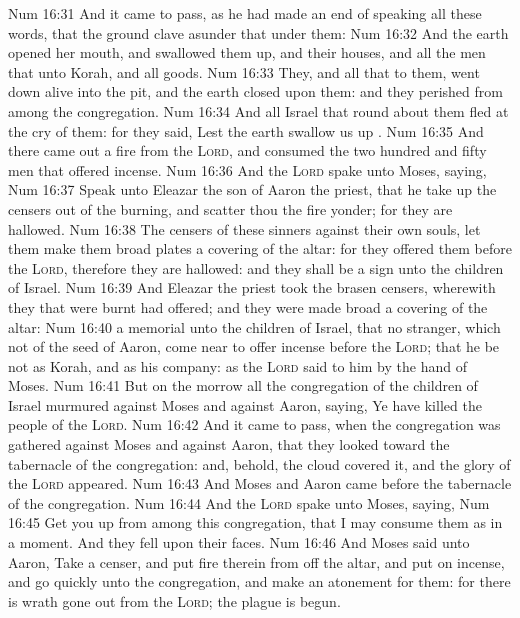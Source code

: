 \vs Num 16:31 And it came to pass, as he had made an end of speaking all these words, that the ground clave asunder that  under them:
\vs Num 16:32 And the earth opened her mouth, and swallowed them up, and their houses, and all the men that  unto Korah, and all  goods.
\vs Num 16:33 They, and all that  to them, went down alive into the pit, and the earth closed upon them: and they perished from among the congregation.
\vs Num 16:34 And all Israel that  round about them fled at the cry of them: for they said, Lest the earth swallow us up .
\vs Num 16:35 And there came out a fire from the \textsc{Lord}, and consumed the two hundred and fifty men that offered incense.
\vs Num 16:36 And the \textsc{Lord} spake unto Moses, saying,
\vs Num 16:37 Speak unto Eleazar the son of Aaron the priest, that he take up the censers out of the burning, and scatter thou the fire yonder; for they are hallowed.
\vs Num 16:38 The censers of these sinners against their own souls, let them make them broad plates  a covering of the altar: for they offered them before the \textsc{Lord}, therefore they are hallowed: and they shall be a sign unto the children of Israel.
\vs Num 16:39 And Eleazar the priest took the brasen censers, wherewith they that were burnt had offered; and they were made broad  a covering of the altar:
\vs Num 16:40  a memorial unto the children of Israel, that no stranger, which  not of the seed of Aaron, come near to offer incense before the \textsc{Lord}; that he be not as Korah, and as his company: as the \textsc{Lord} said to him by the hand of Moses.
\vs Num 16:41 But on the morrow all the congregation of the children of Israel murmured against Moses and against Aaron, saying, Ye have killed the people of the \textsc{Lord}.
\vs Num 16:42 And it came to pass, when the congregation was gathered against Moses and against Aaron, that they looked toward the tabernacle of the congregation: and, behold, the cloud covered it, and the glory of the \textsc{Lord} appeared.
\vs Num 16:43 And Moses and Aaron came before the tabernacle of the congregation.
\vs Num 16:44 And the \textsc{Lord} spake unto Moses, saying,
\vs Num 16:45 Get you up from among this congregation, that I may consume them as in a moment. And they fell upon their faces.
\vs Num 16:46 And Moses said unto Aaron, Take a censer, and put fire therein from off the altar, and put on incense, and go quickly unto the congregation, and make an atonement for them: for there is wrath gone out from the \textsc{Lord}; the plague is begun.
